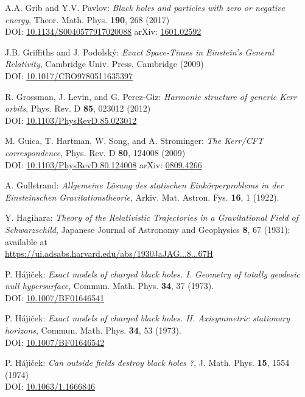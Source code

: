 \begin{thebibliography}{123}
A.A. Grib and Y.V. Pavlov:
{\em Black holes and particles with zero or negative energy},
Theor. Math. Phys. {\bf 190}, 268 (2017)\\
DOI: \href{https://doi.org/10.1134/S0040577917020088}{10.1134/S0040577917020088}\hfill
arXiv: \href{https://arxiv.org/abs/1601.02592}{1601.02592}

J.B. Griffiths and J. Podolský:
{\em Exact Space-Times in Einstein's General Relativity},
Cambridge Univ. Press, Cambridge (2009)\\
DOI: \href{https://doi.org/10.1017/CBO9780511635397}{10.1017/CBO9780511635397}

R. Grossman, J. Levin, and G. Perez-Giz:
{\em Harmonic structure of generic Kerr orbits},
Phys. Rev. D {\bf 85}, 023012 (2012)\\
DOI: \href{https://doi.org/10.1103/PhysRevD.85.023012}{10.1103/PhysRevD.85.023012}

M. Guica, T. Hartman, W. Song, and A. Strominger:
{\em The Kerr/CFT correspondence},
Phys. Rev. D {\bf 80}, 124008 (2009)\\
DOI: \href{https://doi.org/10.1103/PhysRevD.80.124008}{10.1103/PhysRevD.80.124008}\hfill
arXiv: \href{https://arxiv.org/abs/0809.4266}{0809.4266}

A. Gullstrand:
\emph{Allgemeine Lösung des statischen Einkörperproblems in der Einsteinschen Gravitationstheorie},
Arkiv. Mat. Astron. Fys. {\bf 16}, 1 (1922).

Y. Hagihara:
\emph{Theory of the Relativistic Trajectories in a Gravitational Field of Schwarzschild},
Japanese Journal of Astronomy and Geophysics {\bf 8}, 67 (1931);
available at \\
\url{https://ui.adsabs.harvard.edu/abs/1930JaJAG...8...67H}

P. H\'a\'\j i\v{c}ek: {\em Exact models of charged black holes. I. Geometry
of totally geodesic null hypersurface},
Commun. Math. Phys. {\bf 34}, 37 (1973). \\
DOI: \href{https://doi.org/10.1007/BF01646541}{10.1007/BF01646541}

P. H\'a\'\j i\v{c}ek: {\em Exact models of charged black holes.
II. Axisymmetric stationary horizons},
Commun. Math. Phys. {\bf 34}, 53 (1973). \\
DOI: \href{https://doi.org/10.1007/BF01646542}{10.1007/BF01646542}

P. H\'a\'\j i\v{c}ek: {\em Can outside fields destroy black holes ?},
J. Math. Phys. {\bf 15}, 1554 (1974)\\
DOI: \href{https://doi.org/10.1063/1.1666846}{10.1063/1.1666846}


\end{thebibliography}
